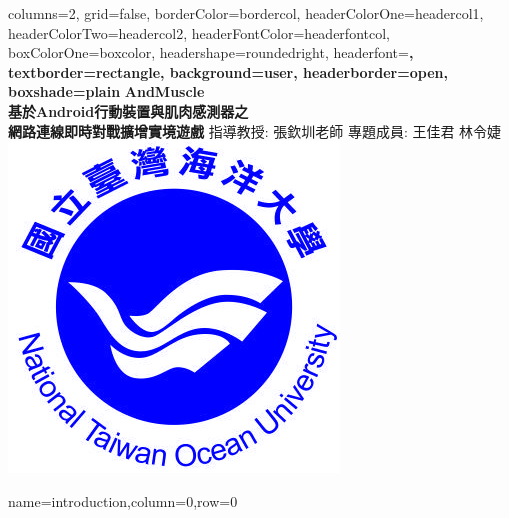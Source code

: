 \documentclass[a0paper,portrait]{baposter}
\begin{document}
\begin{poster}{
columns=2,
grid=false,
borderColor=bordercol, %
headerColorOne=headercol1, %
headerColorTwo=headercol2, %
headerFontColor=headerfontcol, %
boxColorOne=boxcolor, %
headershape=roundedright, %
headerfont=\Large\sf\bf, %
textborder=rectangle,
background=user,
headerborder=open, %
boxshade=plain
}
{}
%
%
{\sf\bf AndMuscle \\ \smaller \smaller 基於Android行動裝置與肌肉感測器之 \\ 網路連線即時對戰擴增實境遊戲} %
{\vspace{1em} 指導教授: 張欽圳\space 老師
 \space \space 專題成員: 王佳君 \space 林令婕 %
}
{\includegraphics[scale=1.0]{ntoulogo}} %


{name=introduction,column=0,row=0}{

}
\end{poster}
\end{document}
